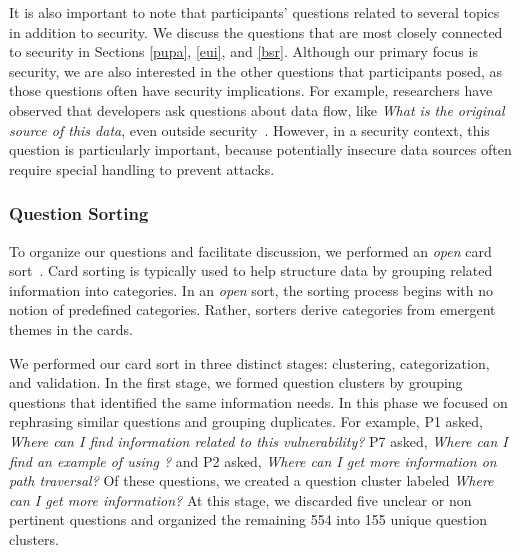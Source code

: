 \documentclass{acm_proc_article-sp}
\begin{document}
It is also important to note that participants' questions related to several topics in addition to security. 
We discuss the questions that are most closely connected to security in Sections \ref{pupa}, \ref{eui}, and \ref{bsr}.
Although our primary focus is security, we are also interested in the other questions that participants posed, as those questions often have security implications.
For example, researchers have observed that developers ask questions about data flow, like \emph{What is the original source of this data}, even outside security~\cite{latoza2010hard}.
However, in a security context, this question is particularly important, because potentially insecure data sources often require special handling to prevent attacks.


\subsubsection{Question Sorting}
To organize our questions and facilitate discussion, we performed an \textit{open} card sort~\cite{hudson2013sorting}. 
Card sorting is typically used to help structure data by grouping related information into categories. 
In an \textit{open} sort, the sorting process begins with no notion of predefined categories. 
Rather, sorters derive categories from emergent themes in the cards. 

We performed our card sort in three distinct stages: clustering, categorization, and validation.
In the first stage, we formed question clusters by grouping questions that identified the same information needs. 
In this phase we focused on rephrasing similar questions and grouping duplicates.
For example, P1 asked, \textit{Where can I find information related to this vulnerability?} P7 asked, \textit{Where can I find an example of using ?} and P2 asked, \textit{Where can I get more information on path traversal?} 
Of these questions, we created a question cluster labeled \textit{Where can I get more information?}
At this stage, we discarded five unclear or non pertinent questions and organized the remaining 554 into 155 unique question clusters.
\end{document}

